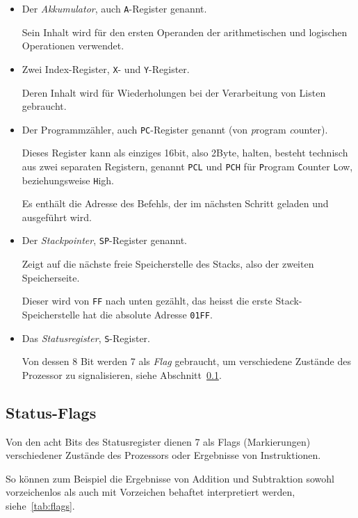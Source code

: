 \documentclass[11pt]{scrartcl}
\newcommand{\byte}{\unit{Byte}}
\newcommand{\bit}{\unit{bit}}
\newcommand{\xreg}{\texttt{X}}
\newcommand{\yreg}{\texttt{Y}}
\newcommand{\acc}{\texttt{A}}
\newcommand{\stp}{\texttt{SP}}
\newcommand{\sreg}{\texttt{S}}
\newcommand{\pc}{\texttt{PC}}
\begin{document}
\begin{itemize}
\item Der \emph{Akkumulator}, auch \acc-Register genannt.
    
  Sein Inhalt wird für den ersten Operanden der arithmetischen und
  logischen Operationen verwendet.
\item Zwei Index-Register, \xreg- und \yreg-Register.
    
  Deren Inhalt wird für Wiederholungen bei der Verarbeitung von Listen
  gebraucht.
\item Der Programmzähler, auch \pc-Register genannt (von
  \emph{p}rogram \emph{c}ounter).

  Dieses Register kann als einziges 16\bit, also 2\byte, halten,
  besteht technisch aus zwei separaten Registern, genannt \texttt{PCL}
  und \texttt{PCH} für \texttt{P}rogram \texttt{C}ounter \texttt{L}ow,
  beziehungsweise \texttt{H}igh.
  
  Es enthält die Adresse des Befehls, der im nächsten Schritt geladen
  und ausgeführt wird.  
\item Der \emph{Stackpointer}, \stp-Register genannt.
     
  Zeigt auf die nächste freie Speicherstelle des Stacks, also der
  zweiten Speicherseite.
    
  Dieser wird von \texttt{FF} nach unten gezählt, das heisst die erste
  Stack-Speicherstelle hat die absolute Adresse \texttt{01FF}.
\item Das \emph{Statusregister}, \sreg-Register.
    
  Von dessen 8 Bit werden 7 als \emph{Flag} gebraucht, um verschiedene
  Zustände des Prozessor zu signalisieren, siehe Abschnitt~\ref{sec:flags}. 
\end{itemize}

\subsection{Status-Flags}
\label{sec:flags}

Von den acht Bits des Statusregister dienen 7 als Flags (Markierungen)
verschiedener Zustände des Prozessors oder Ergebnisse von
Instruktionen.

So können zum Beispiel die Ergebnisse von Addition und
Subtraktion sowohl vorzeichenlos als auch mit Vorzeichen behaftet
interpretiert werden, siehe~\ref{tab:flags}.
\end{document}
